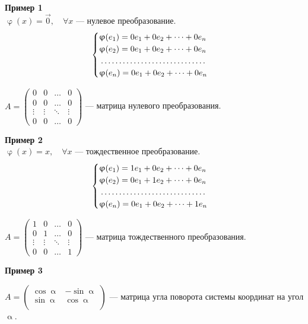 \documentclass[a4paper, 12pt]{article}
\renewcommand{\alpha}{\upalpha}
\renewcommand{\varphi}{\upvarphi}
\begin{document}
\textbf{Пример 1}\\
$\varphi(x) = \vec 0, \quad \forall x$ --- нулевое преобразование.
$$\begin{cases}
     \varphi(e_1)=0e_1+0e_2+\dots+0e_n\\  
     \varphi(e_2)=0e_1+0e_2+\dots+0e_n\\ 
     \dotfill\\
     \varphi(e_n)=0e_1+0e_2+\dots+0e_n\\ 
\end{cases}$$
\begin{center}
    $A = \begin{pmatrix}
    0 & 0 & \dots & 0\\
    0 & 0 & \dots & 0\\
    \vdots & \vdots & \ddots & \vdots\\
    0 & 0 & \dots & 0
    \end{pmatrix}$
    --- матрица нулевого преобразования.\\
    \end{center}
\textbf{Пример 2}\\
$\varphi(x) = x, \quad \forall x$ --- тождественное преобразование.
$$\begin{cases}
     \varphi(e_1)=1e_1+0e_2+\dots+0e_n\\  
     \varphi(e_2)=0e_1+1e_2+\dots+0e_n\\ 
     \dotfill\\
     \varphi(e_n)=0e_1+0e_2+\dots+1e_n\\ 
\end{cases}$$
\begin{center}
    $A = \begin{pmatrix}
    1 & 0 & \dots & 0\\
    0 & 1 & \dots & 0\\
    \vdots & \vdots & \ddots & \vdots\\
    0 & 0 & \dots & 1
    \end{pmatrix}$
    --- матрица тождественного преобразования.\\
    \end{center}    
\textbf{Пример 3}
\begin{center}
    $A = \begin{pmatrix}
    \cos \alpha & -\sin \alpha\\
    \sin \alpha & \cos \alpha\\
    \end{pmatrix}$
    --- матрица угла поворота системы координат на угол $\alpha$.\\
    \end{center}
\end{document}
